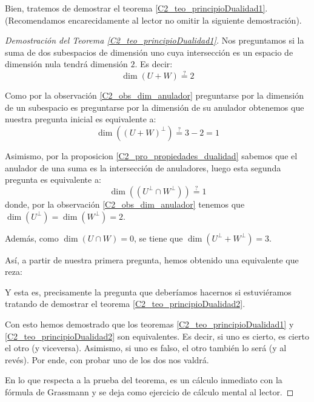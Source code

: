 Bien, tratemos de demostrar el teorema \ref{C2_teo_principioDualidad1}. (Recomendamos encarecidamente al lector no omitir la siguiente demostración).
\begin{proof}[Demostración del Teorema \ref{C2_teo_principioDualidad1}]
	Nos preguntamos si la suma de dos subespacios de dimensión uno cuya intersección es un espacio de dimensión nula tendrá dimensión $2$. Es decir:
	\begin{equation*}
		\dim(U+W)\stackrel{\mathrm{?}}{=}2
	\end{equation*}
	
	Como por la observación \ref{C2_obs_dim_anulador} preguntarse por la dimensión de un subespacio es preguntarse por la dimensión de su anulador obtenemos que nuestra pregunta inicial es equivalente a:
	\begin{equation*}
		\dim((U+W)^\perp)\stackrel{\mathrm{?}}{=}3-2=1
	\end{equation*}
	
	Asimismo, por la proposicion \ref{C2_pro_propiedades_dualidad} sabemos que el anulador de una suma es la intersección de anuladores, luego esta segunda pregunta es equivalente a:
	\begin{equation*}
		\dim((U^\perp\cap W^\perp))\stackrel{\mathrm{?}}{=}1
	\end{equation*}
	donde, por la observación \ref{C2_obs_dim_anulador} tenemos que $\dim(U^\perp)=\dim(W^\perp)=2$.
	
	Además, como $\dim(U\cap W)=0$, se tiene que $\dim(U^\perp+W^\perp)=3$.
	
	Así, a partir de nuestra primera pregunta, hemos obtenido una equivalente que reza:
	
	
	Y esta es, precisamente la pregunta que deberíamos hacernos si estuviéramos tratando de demostrar el teorema \ref{C2_teo_principioDualidad2}.
	
	Con esto hemos demostrado que los teoremas \ref{C2_teo_principioDualidad1} y \ref{C2_teo_principioDualidad2} son equivalentes. Es decir, si uno es cierto, es cierto el otro (y viceversa). Asimismo, si uno es falso, el otro también lo será (y al revés). Por ende, con probar uno de los dos nos valdrá.
	
	En lo que respecta a la prueba del teorema, es un cálculo inmediato con la fórmula de Grassmann y se deja como ejercicio de cálculo mental al lector.
\end{proof}

